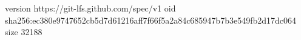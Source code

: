 version https://git-lfs.github.com/spec/v1
oid sha256:ec380e9747652cb5d7d61216aff7f66f5a2a84c685947b7b3e549fb2d17dc064
size 32188
